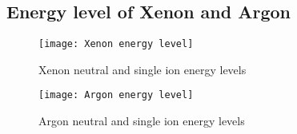 \documentclass[a4paper,11pt]{article}
\begin{document}
\subsection*{Energy level of Xenon and Argon}
\begin{figure}[htbp]
  \centering
  \texttt{[image: Xenon energy level]}
  \caption{Xenon neutral and single ion energy levels}
  \label{2}
  \end{figure}
\begin{figure}[htbp]
  \centering
  \texttt{[image: Argon energy level]}
  \caption{Argon neutral and single ion energy levels}
  \label{2}
  \end{figure}
\end{document}
